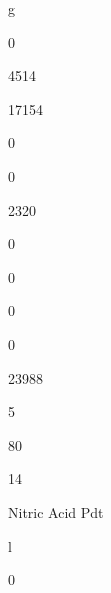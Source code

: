 \documentclass[a4paper,portrait,12pt]{article}
\begin{document}
\begin{flushleft}
g
\end{flushleft}





0





4514





17154





0





0





2320





0





0





0





0





23988





5





80





14





\begin{flushleft}
Nitric Acid Pdt
\end{flushleft}





\begin{flushleft}
l
\end{flushleft}





0
\end{document}
